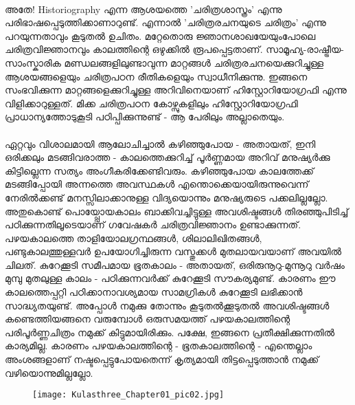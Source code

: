 \label{ch1box1} %
\begin{tcolorbox}[%
  breakable, %
  arc=0mm, 
  left=1pt, right = 1pt, 
  boxrule=0mm,
  colback = {blue!10}, %
] 
{\paragraph{}അതേ! Historiography എന്ന ആശയത്തെ 'ചരിത്രശാസ്ത്രം' എന്നു പരിഭാഷപ്പെടുത്തിക്കാണാറുണ്ട്. എന്നാൽ 'ചരിത്രരചനയുടെ ചരിത്രം' എന്നു പറയുന്നതാവും കൂടുതൽ ഉചിതം. മറ്റേതൊരു ജ്ഞാനശാഖയേയുംപോലെ ചരിത്രവിജ്ഞാനവും കാലത്തിന്റെ ഒഴുക്കിൽ രൂപപ്പെട്ടതാണ്. സാമൂഹ്യ-രാഷ്ട്രീയ-സാംസ്കാരിക മണ്ഡലങ്ങളിലുണ്ടാവുന്ന മാറ്റങ്ങൾ ചരിത്രരചനയെക്കുറിച്ചുള്ള ആശയങ്ങളെയും ചരിത്രപഠന രീതികളെയും സ്വാധീനിക്കുന്നു. ഇങ്ങനെ സംഭവിക്കുന്ന മാറ്റങ്ങളെക്കുറിച്ചുള്ള അറിവിനെയാണ് ഹിസ്റ്റോറിയോഗ്രഫി എന്നു വിളിക്കാറുള്ളത്. മിക്ക ചരിത്രപഠന കോഴ്സുകളിലും ഹിസ്റ്റോറിയോഗ്രഫി പ്രാധാന്യത്തോടുകൂടി പഠിപ്പിക്കുന്നുണ്ട് - ആ പേരിലും അല്ലാതെയും.}
\end{tcolorbox}


\paragraph{}	ഏറ്റവും വിശാലമായി ആലോചിച്ചാൽ കഴിഞ്ഞുപോയ - അതായത്, ഇനി ഒരിക്കലും മടങ്ങിവരാത്ത - കാലത്തെക്കുറിച്ച് പൂർണ്ണമായ അറിവ് മനുഷ്യർക്കു കിട്ടില്ലെന്ന സത്യം അംഗീകരിക്കേണ്ടിവരും. കഴിഞ്ഞുപോയ കാലത്തേക്ക് മടങ്ങിപ്പോയി അന്നത്തെ അവസ്ഥകൾ എന്തൊക്കെയായിരുന്നുവെന്ന് നേരിൽക്കണ്ട് മനസ്സിലാക്കാനുള്ള വിദ്യയൊന്നും മനുഷ്യരുടെ പക്കലില്ലല്ലോ. അതുകൊണ്ട് പൊയ്പ്പോയകാലം ബാക്കിവച്ചിട്ടുള്ള അവശിഷ്ടങ്ങൾ തിരഞ്ഞുപിടിച്ച് പഠിക്കുന്നതിലൂടെയാണ് ഗവേഷകർ ചരിത്രവിജ്ഞാനം ഉണ്ടാക്കുന്നത്. പഴയകാലത്തെ താളിയോലഗ്രന്ഥങ്ങൾ, ശിലാലിഖിതങ്ങൾ, പണ്ടുകാലത്തുള്ളവർ ഉപയോഗിച്ചിരുന്ന വസ്തുക്കൾ മുതലായവയാണ് അവയിൽ ചിലത്. കുറേക്കൂടി സമീപമായ ഭൂതകാലം - അതായത്, ഒരിരുനൂറു-മുന്നൂറു വർഷം മുമ്പു മുതലുള്ള കാലം - പഠിക്കുന്നവർക്ക് കുറേക്കൂടി സൗകര്യമുണ്ട്. കാരണം ഈ കാലത്തെപ്പറ്റി പഠിക്കാനാവശ്യമായ സാമഗ്രികൾ കുറേക്കൂടി ലഭിക്കാൻ സാദ്ധ്യതയുണ്ട്. അപ്പോൾ നമുക്കു തോന്നും കൂടുതൽക്കൂടുതൽ അവശിഷ്ടങ്ങൾ കണ്ടെത്തിയങ്ങനെ വരുമ്പോൾ ഒരുസമയത്ത് പഴയകാലത്തിന്റെ പരിപൂർണ്ണചിത്രം നമുക്ക് കിട്ടുമായിരിക്കും. പക്ഷേ, ഇങ്ങനെ പ്രതീക്ഷിക്കുന്നതിൽ കാര്യമില്ല. കാരണം പഴയകാലത്തിന്റെ - ഭൂതകാലത്തിന്റെ - എന്തെല്ലാം അംശങ്ങളാണ് നഷ്ടപ്പെട്ടുപോയതെന്ന് കൃത്യമായി തിട്ടപ്പെടുത്താൻ നമുക്ക് വഴിയൊന്നുമില്ലല്ലോ.
\begin{figure}[h]
\begin{center}
\texttt{[image: Kulasthree\_Chapter01\_pic02.jpg]}
\end{center}
\end{figure}



